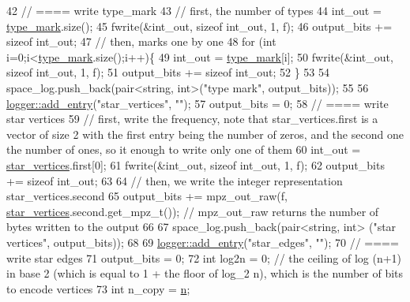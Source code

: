 \begin{DoxyCode}
42   \textcolor{comment}{// ==== write type\_mark}
43   \textcolor{comment}{// first, the number of types}
44   int\_out = \hyperlink{classmarked__graph__compressed_a86b00223525703e973415cbc9c94da68}{type\_mark}.size();
45   fwrite(&int\_out, \textcolor{keyword}{sizeof} int\_out, 1, f);
46   output\_bits += \textcolor{keyword}{sizeof} int\_out;
47   \textcolor{comment}{// then, marks one by one}
48   \textcolor{keywordflow}{for} (\textcolor{keywordtype}{int} i=0;i<\hyperlink{classmarked__graph__compressed_a86b00223525703e973415cbc9c94da68}{type\_mark}.size();i++)\{
49     int\_out = \hyperlink{classmarked__graph__compressed_a86b00223525703e973415cbc9c94da68}{type\_mark}[i];
50     fwrite(&int\_out, \textcolor{keyword}{sizeof} int\_out, 1, f);
51     output\_bits += \textcolor{keyword}{sizeof} int\_out;
52   \}
53 
54   space\_log.push\_back(pair<string, int>(\textcolor{stringliteral}{"type mark"}, output\_bits));
55 
56   \hyperlink{classlogger_a710163deb17bc81f70d53d285b8ac9ac}{logger::add\_entry}(\textcolor{stringliteral}{"star\_vertices"}, \textcolor{stringliteral}{""});
57   output\_bits = 0;
58   \textcolor{comment}{// ==== write star vertices}
59   \textcolor{comment}{// first, write the frequency, note that star\_vertices.first is a vector of size 2 with the first entry
       being the number of zeros, and the second one the number of ones, so it enough to write only one of them}
60   int\_out = \hyperlink{classmarked__graph__compressed_a7a4ced4586e2e353f9076bd447df5208}{star\_vertices}.first[0];
61   fwrite(&int\_out, \textcolor{keyword}{sizeof} int\_out, 1, f);
62   output\_bits += \textcolor{keyword}{sizeof} int\_out;
63 
64   \textcolor{comment}{// then, we write the integer representation star\_vertices.second}
65   output\_bits +=  mpz\_out\_raw(f, \hyperlink{classmarked__graph__compressed_a7a4ced4586e2e353f9076bd447df5208}{star\_vertices}.second.get\_mpz\_t()); \textcolor{comment}{// mpz\_out\_raw returns the
       number of bytes written to the output}
66 
67   space\_log.push\_back(pair<string, int> (\textcolor{stringliteral}{"star vertices"}, output\_bits));
68 
69   \hyperlink{classlogger_a710163deb17bc81f70d53d285b8ac9ac}{logger::add\_entry}(\textcolor{stringliteral}{"star\_edges"}, \textcolor{stringliteral}{""});
70   \textcolor{comment}{// ==== write star edges}
71   output\_bits = 0;
72   \textcolor{keywordtype}{int} log2n = 0; \textcolor{comment}{// the ceiling of log (n+1) in base 2 (which is equal to 1 + the floor of log\_2 n), which
       is the number of bits to encode vertices}
73   \textcolor{keywordtype}{int} n\_copy = \hyperlink{classmarked__graph__compressed_a8d841016ddb11cfd33748c8deb6277ba}{n};

\end{DoxyCode}
